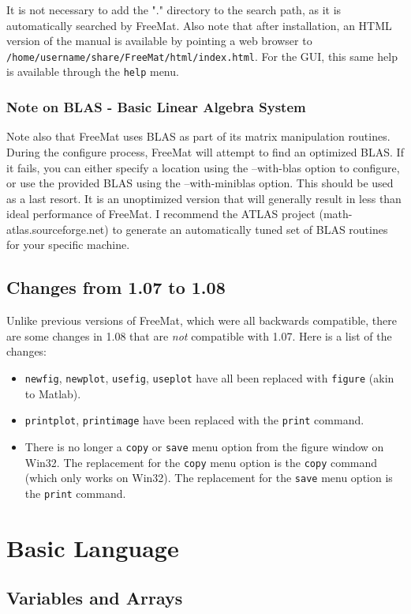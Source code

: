 \documentclass{book}
\begin{document}
It is not necessary to add the "." directory to the search path, as it is automatically searched by FreeMat. Also note that after installation, an HTML version of the manual is available by pointing a web browser to \verb|/home/username/share/FreeMat/html/index.html|.  For the GUI, this same help is available through the \verb|help| menu.

\subsection{Note on BLAS - Basic Linear Algebra System}
Note also that FreeMat uses BLAS as part of its matrix manipulation routines.  During the configure process, FreeMat will attempt to find an optimized BLAS.  If it fails, you can either specify a location using the --with-blas option to configure, or use the provided BLAS using the --with-miniblas option.  This should be used as a last resort.  It is an unoptimized version that will generally result in less than ideal performance of FreeMat.  I recommend the ATLAS project (math-atlas.sourceforge.net) to generate an automatically tuned set of BLAS routines for your specific machine.

\section{Changes from 1.07 to 1.08}
Unlike previous versions of FreeMat, which were all backwards compatible, there are some changes in 1.08 that are \emph{not} compatible with 1.07.  Here is a list of the changes:
\begin{itemize}
\item \verb|newfig|, \verb|newplot|, \verb|usefig|, \verb|useplot| have all been replaced with \verb|figure| (akin to Matlab).
\item \verb|printplot|, \verb|printimage| have been replaced with the \verb|print| command.
\item There is no longer a \verb|copy| or \verb|save| menu option from the figure window on Win32.  The replacement for the \verb|copy| menu option is the \verb|copy| command (which only works on Win32).  The replacement for the \verb|save| menu option  is the \verb|print| command.
\end{itemize}
\chapter{Basic Language}
\section{Variables and Arrays}

\end{document}
